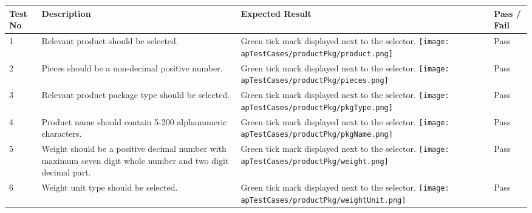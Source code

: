 \documentclass[12pt]{report}
\begin{document}
\begin{longtable}{ | p{1cm} | p{5cm} | p{5cm} | p{2cm} | }
	\hline
	\bf{Test No} & \bf{Description} & \bf{Expected Result} & \bf{Pass / Fail} \\
	\hline
	1
	             &
	Relevant product should be selected.
	             &
	Green tick mark displayed next to the selector.\newline
	\texttt{[image: apTestCases/productPkg/product.png]}
	             &
	Pass                                                                      \\
	\hline
	2
	             &
	Pieces should be a non-decimal positive number.
	             &
	Green tick mark displayed next to the selector.\newline
	\texttt{[image: apTestCases/productPkg/pieces.png]}
	             &
	Pass                                                                      \\
	\hline
	3
	             &
	Relevant product package type should be selected.
	             &
	Green tick mark displayed next to the selector.\newline
	\texttt{[image: apTestCases/productPkg/pkgType.png]}
	             &
	Pass                                                                      \\
	\hline
	4
	             &
	Product name should contain 5-200 alphanumeric characters.
	             &
	Green tick mark displayed next to the selector.\newline
	\texttt{[image: apTestCases/productPkg/pkgName.png]}
	             &
	Pass                                                                      \\
	\hline
	5
	             &
	Weight should be a positive decimal number with maximum seven digit whole number and two digit decimal part.
	             &
	Green tick mark displayed next to the selector.\newline
	\texttt{[image: apTestCases/productPkg/weight.png]}
	             &
	Pass                                                                      \\
	\hline
	6
	             &
	Weight unit type should be selected.
	             &
	Green tick mark displayed next to the selector.\newline
	\texttt{[image: apTestCases/productPkg/weightUnit.png]}
	             &
	Pass                                                                      \\

\end{longtable}
\end{document}
